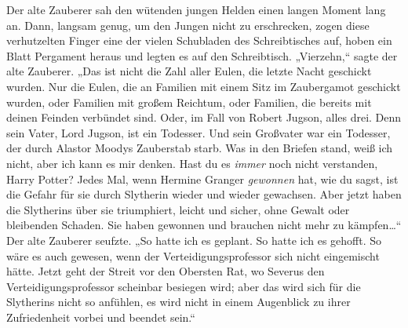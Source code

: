 Der alte Zauberer sah den wütenden jungen Helden einen langen Moment lang an. Dann, langsam genug, um den Jungen nicht zu erschrecken, zogen diese verhutzelten Finger eine der vielen Schubladen des Schreibtisches auf, hoben ein Blatt Pergament heraus und legten es auf den Schreibtisch. „Vierzehn,“ sagte der alte Zauberer. „Das ist nicht die Zahl aller Eulen, die letzte Nacht geschickt wurden. Nur die Eulen, die an Familien mit einem Sitz im Zaubergamot geschickt wurden, oder Familien mit großem Reichtum, oder Familien, die bereits mit deinen Feinden verbündet sind. Oder, im Fall von Robert Jugson, alles drei. Denn sein Vater, Lord Jugson, ist ein Todesser. Und sein Großvater war ein Todesser, der durch Alastor Moodys Zauberstab starb. Was in den Briefen stand, weiß ich nicht, aber ich kann es mir denken. Hast du es \emph{immer} noch nicht verstanden, Harry Potter? Jedes Mal, wenn Hermine Granger \emph{gewonnen} hat, wie du sagst, ist die Gefahr für sie durch Slytherin wieder und wieder gewachsen. Aber jetzt haben die Slytherins über sie triumphiert, leicht und sicher, ohne Gewalt oder bleibenden Schaden. Sie haben gewonnen und brauchen nicht mehr zu kämpfen…“ Der alte Zauberer seufzte. „So hatte ich es geplant. So hatte ich es gehofft. So wäre es auch gewesen, wenn der Verteidigungsprofessor sich nicht eingemischt hätte. Jetzt geht der Streit vor den Obersten Rat, wo Severus den Verteidigungsprofessor scheinbar besiegen wird; aber das wird sich für die Slytherins nicht so anfühlen, es wird nicht in einem Augenblick zu ihrer Zufriedenheit vorbei und beendet sein.“

